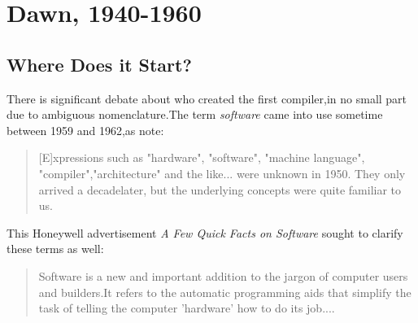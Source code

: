 \chapter{Dawn, 1940-1960}
\section{Where Does it Start?}
There is significant debate about who created the first compiler,in no small
part due to ambiguous nomenclature.The term \textit{software} came into use
sometime between 1959 and 1962,as \citeauthor{the-first-computers-2002} note:
\begin{quotation}
    [E]xpressions such as "hardware", "software", "machine language", "compiler","architecture" and the like... were unknown in 1950. They only arrived a decadelater, but the underlying concepts were quite familiar to us.
    \cite{the-first-computers-2002}
\end{quotation}

This Honeywell advertisement \textit{A Few Quick Facts on Software} sought to
clarify these terms as well:

\begin{quotation}
    Software is a new and important addition to the jargon of computer users and builders.It refers to the automatic programming aids that simplify the task of telling the computer 'hardware' how to do its job....%
    \cite[ch.5]{new-history-of-modern-computing}
\end{quotation}

